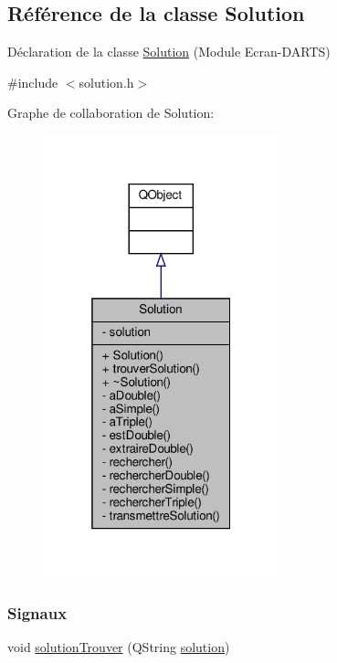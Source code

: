 \hypertarget{class_solution}{}\subsection{Référence de la classe Solution}
\label{class_solution}


Déclaration de la classe \hyperlink{class_solution}{Solution} (Module Ecran-\/\+D\+A\+R\+TS)  




{\ttfamily \#include $<$solution.\+h$>$}



Graphe de collaboration de Solution\+:
\nopagebreak
\begin{figure}[H]
\begin{center}
\leavevmode
\includegraphics[width=193pt]{class_solution__coll__graph}
\end{center}
\end{figure}
\subsubsection*{Signaux}
\begin{DoxyCompactItemize}
\item 
void \hyperlink{class_solution_a052b7ba921e7b211d14f2bbbc6b63832}{solution\+Trouver} (Q\+String \hyperlink{class_solution_a03b47dedfe8a8f8244f7e633cbaa30fb}{solution})
\end{DoxyCompactItemize}
